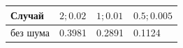 \begin{tabular}{|l|l|l|l|}
\hline
Случай & $2; 0.02$ & $1; 0.01$ & $0.5; 0.005$ \\
\hline
без шума & 0.3981 & 0.2891 & 0.1124 \\
\hline
\end{tabular}
